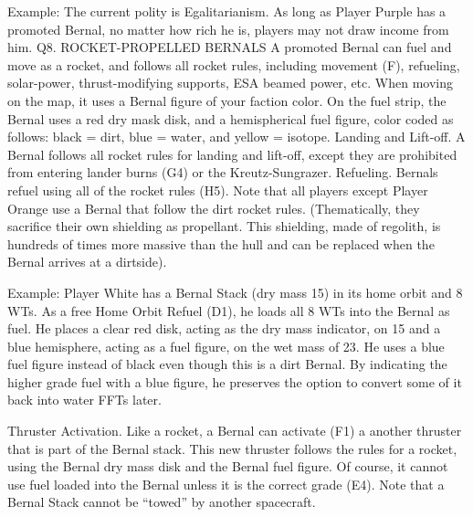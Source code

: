 \documentclass[a4paper]{book}
\begin{document}
Example: The current polity is Egalitarianism. As long as Player Purple has a promoted Bernal, no matter how rich he is, players may not draw income from him.
Q8. ROCKET-PROPELLED BERNALS
A promoted Bernal can fuel and move as a rocket, and follows all rocket rules, including movement (F), refueling, solar-power, thrust-modifying supports, ESA beamed power, etc. When moving on the map, it uses a Bernal figure of your faction color. On the fuel strip, the Bernal uses a red dry mask disk, and a hemispherical fuel figure, color coded as follows: black = dirt, blue = water, and yellow = isotope.
Landing and Lift-off. A Bernal follows all rocket rules for landing and lift-off, except they are prohibited from entering lander burns (G4) or the Kreutz-Sungrazer.
Refueling. Bernals refuel using all of the rocket rules (H5). Note that all players except Player Orange use a Bernal that follow the dirt rocket rules. (Thematically, they sacrifice their own shielding as propellant. This shielding, made of regolith, is hundreds of times more massive than the hull and can be replaced when the Bernal arrives at a dirtside).

Example: Player White has a Bernal Stack (dry mass 15) in its home orbit and 8 WTs. As a free Home Orbit Refuel (D1), he loads all 8 WTs into the Bernal as fuel. He places a clear red disk, acting as the dry mass indicator, on 15 and a blue hemisphere, acting as a fuel figure, on the wet mass of 23. He uses a blue fuel figure instead of black even though this is a dirt Bernal. By indicating the higher grade fuel with a blue figure, he preserves the option to convert some of it back into water FFTs later.

Thruster Activation. Like a rocket, a Bernal can activate (F1) a another thruster that is part of the Bernal stack. This new thruster follows the rules for a rocket, using the Bernal dry mass disk and the Bernal fuel figure. Of course, it cannot use fuel loaded into the Bernal unless it is the correct grade (E4). Note that a Bernal Stack cannot be “towed” by another spacecraft.
 
\end{document}
